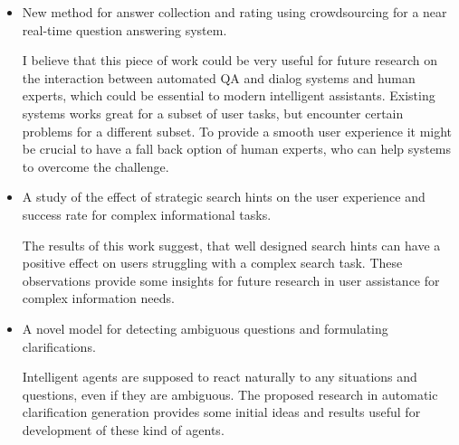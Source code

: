 \begin{itemize}
\item New method for answer collection and rating using crowdsourcing for a near real-time question answering system.

I believe that this piece of work could be very useful for future research on the interaction between automated QA and dialog systems and human experts, which could be essential to modern intelligent assistants.
Existing systems works great for a subset of user tasks, but encounter certain problems for a different subset.
To provide a smooth user experience it might be crucial to have a fall back option of human experts, who can help systems to overcome the challenge.

\item A study of the effect of strategic search hints on the user experience and success rate for complex informational tasks.

The results of this work suggest, that well designed search hints can have a positive effect on users struggling with a complex search task.
These observations provide some insights for future research in user assistance for complex information needs.

\item A novel model for detecting ambiguous questions and formulating clarifications.

Intelligent agents are supposed to react naturally to any situations and questions, even if they are ambiguous.
The proposed research in automatic clarification generation provides some initial ideas and results useful for development of these kind of agents.

\end{itemize}
